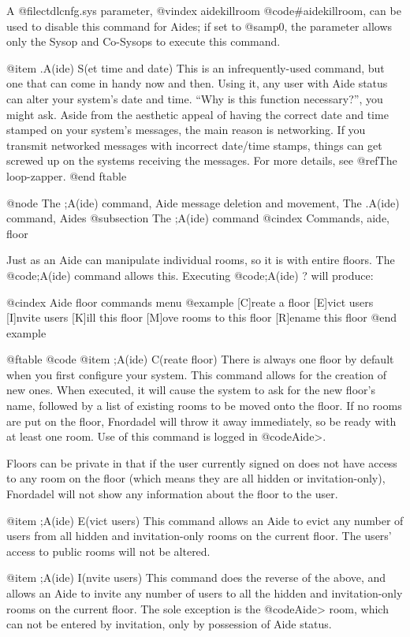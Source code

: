 A @file{ctdlcnfg.sys} parameter,
@vindex aidekillroom
@code{#aidekillroom}, can be used
to disable
this command for Aides; if set to @samp{0}, the parameter allows
only the Sysop and Co-Sysops to execute this command.

@item .A(ide) S(et time and date)
This is an infrequently-used command, but one that
can come in handy now and then.  Using it, any user with Aide
status can alter your system's date and time.
``Why is this function necessary?'', you might ask.
Aside from the aesthetic appeal of having the
correct date and time stamped on your system's messages, the main reason is
networking.  If you transmit networked messages with
incorrect date/time stamps, things can get screwed up on the
systems receiving the messages.  For more details, see @ref{The loop-zapper}.
@end ftable

@node The ;A(ide) command, Aide message deletion and movement, The .A(ide) command, Aides
@subsection The ;A(ide) command
@cindex Commands, aide, floor

Just as an Aide can manipulate individual rooms, so it is
with entire floors.  The @code{;A(ide)} command allows this.  Executing
@code{;A(ide) ?} will produce:

@cindex Aide floor commands menu
@example
[C]reate a floor
[E]vict users
[I]nvite users
[K]ill this floor
[M]ove rooms to this floor
[R]ename this floor
@end example

@ftable @code
@item ;A(ide) C(reate floor)
There is always one floor by default when you first
configure your system.  This command allows for the creation
of new ones.  When executed, it will cause the system to ask
for the new floor's name, followed by a list of existing
rooms to be moved onto the floor.  If no rooms are put on the
floor, Fnordadel will throw it away immediately, so be
ready with at least one room.  Use of this command is logged
in @code{Aide>}.

Floors can be private in that if the user currently
signed on does not have access to any room on the floor (which
means they are all hidden or invitation-only), Fnordadel
will not show any information about the floor to the user.

@item ;A(ide) E(vict users)
This command allows an Aide to evict any number of
users from all hidden and invitation-only rooms on the current
floor.  The users' access to public rooms will not be altered.

@item ;A(ide) I(nvite users)
This command does the reverse of the above, and allows
an Aide to invite any number of users to all the hidden and
invitation-only rooms on the current floor.  The sole exception
is the @code{Aide>} room, which can not be entered by invitation,
only by possession of Aide status.

